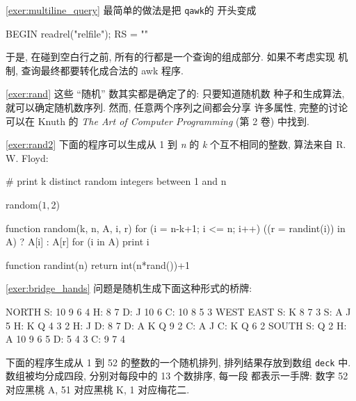 \myexer\ref{exer:multiline_query} 最简单的做法是把 \texttt{qawk}的
开头变成 
\begin{awkcode}
    BEGIN { readrel("relfile"); RS = "" }
\end{awkcode}
于是, 在碰到空白行之前, 所有的行都是一个查询的组成部分. 如果不考虑实现
机制, 查询最终都要转化成合法的 awk 程序.

\myexer\ref{exer:rand} 这些 ``随机'' 数其实都是确定了的: 只要知道随机数
种子和生成算法, 就可以确定随机数序列. 然而, 任意两个序列之间都会分享
许多属性, 完整的讨论可以在 Knuth 的 \textit{The Art of Computer
Programming} (第 2 卷) 中找到.

\myexer\ref{exer:rand2}  下面的程序可以生成从 1 到 \textit{n} 的 \textit{k}
个互不相同的整数, 算法来自 R. W. Floyd:
\begin{awkcode}
    # print k distinct random integers between 1 and n

    { random($1, $2) }

    function random(k, n,    A, i, r) {
        for (i = n-k+1; i <= n; i++)
            ((r = randint(i)) in A) ? A[i] : A[r]
        for (i in A)
            print i
    }

    function randint(n) { return int(n*rand())+1 }
\end{awkcode}

\myexer\ref{exer:bridge_hands} 问题是随机生成下面这种形式的桥牌:
\begin{file}
                        NORTH
                    S: 10 9 6 4
                    H: 8 7
                    D: J 10 6
                    C: 10 8 5 3
       WEST                                 EAST
    S: K 8 7 3                           S: A J 5
    H: K Q 4 3 2                         H: J
    D: 8 7                               D: A K Q 9 2
    C: A J                               C: K Q 6 2
                        SOUTH
                    S: Q 2
                    H: A 10 9 6 5
                    D: 5 4 3
                    C: 9 7 4
\end{file}
下面的程序生成从 1 到 52 的整数的一个随机排列, 排列结果存放到数组
\texttt{deck} 中. 数组被均分成四段, 分别对每段中的 13 个数排序, 每一段
都表示一手牌: 数字 52 对应黑桃 A, 51 对应黑桃 K, 1 对应梅花二.

